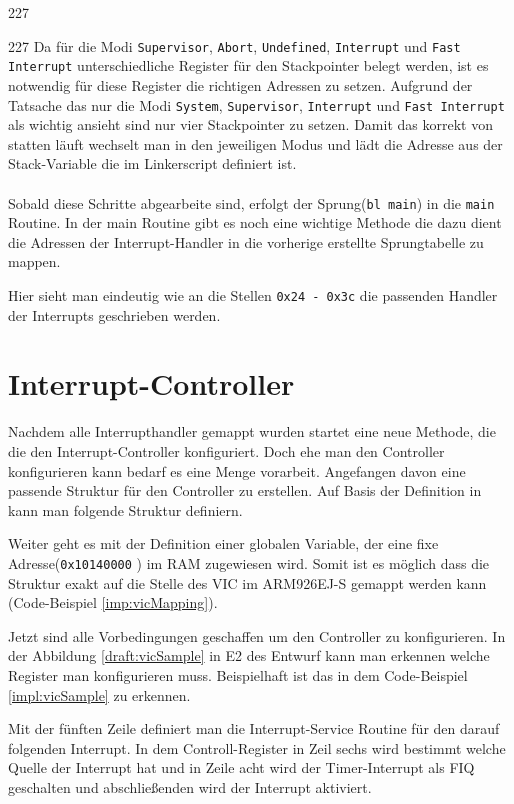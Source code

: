 \begin{dinglist}{227}
\begin{dinglist}{227}
Da f\"ur die Modi \texttt{Supervisor}, \texttt{Abort}, \texttt{Undefined}, \texttt{Interrupt} und \texttt{Fast Interrupt} unterschiedliche Register f\"ur den Stackpointer belegt werden, ist es notwendig f\"ur diese Register die richtigen Adressen zu setzen. Aufgrund der Tatsache das \mops nur die Modi \texttt{System}, \texttt{Supervisor}, \texttt{Interrupt} und \texttt{Fast Interrupt} als wichtig ansieht sind nur vier Stackpointer zu setzen. Damit das korrekt von statten l\"auft wechselt man in den jeweiligen Modus und l\"adt die Adresse aus der  Stack-Variable die im Linkerscript definiert ist.\\\\
Sobald diese Schritte abgearbeite sind, erfolgt der Sprung(\texttt{bl main}) in die \texttt{main} Routine.
In der main Routine gibt es noch eine wichtige Methode die dazu dient die Adressen der Interrupt-Handler in die vorherige erstellte Sprungtabelle zu mappen.
 
Hier sieht man eindeutig wie an die Stellen \texttt{0x24 - 0x3c} die passenden Handler der Interrupts geschrieben werden. 
\end{dinglist}
\end{dinglist} 
\section{Interrupt-Controller}
Nachdem alle Interrupthandler gemappt wurden startet eine neue Methode, die die den Interrupt-Controller konfiguriert. Doch ehe man den Controller konfigurieren kann bedarf es eine Menge vorarbeit. Angefangen davon eine passende Struktur f\"ur den Controller zu erstellen. Auf Basis der Definition in \cite[35]{vic} kann man folgende Struktur definiern.

Weiter geht es mit der Definition einer globalen Variable, der eine fixe Adresse(\texttt{0x10140000} \parencite[vgl. Tabelle 4-37][223]{archManI}) im RAM zugewiesen wird. Somit ist es m\"oglich dass die Struktur exakt auf die Stelle des VIC im ARM926EJ-S gemappt werden kann (Code-Beispiel \ref{imp:vicMapping}). 

Jetzt sind alle Vorbedingungen geschaffen um den Controller zu konfigurieren. In der Abbildung \ref{draft:vicSample} in E2 des Entwurf kann man erkennen welche Register man konfigurieren muss. Beispielhaft ist das in dem Code-Beispiel  \ref{impl:vicSample} zu erkennen.

Mit der f\"unften Zeile definiert man die Interrupt-Service Routine f\"ur den darauf folgenden Interrupt. In dem Controll-Register in Zeil sechs wird bestimmt welche Quelle der Interrupt hat und in Zeile acht wird der Timer-Interrupt als FIQ geschalten und abschlie\ss enden wird der Interrupt aktiviert.
